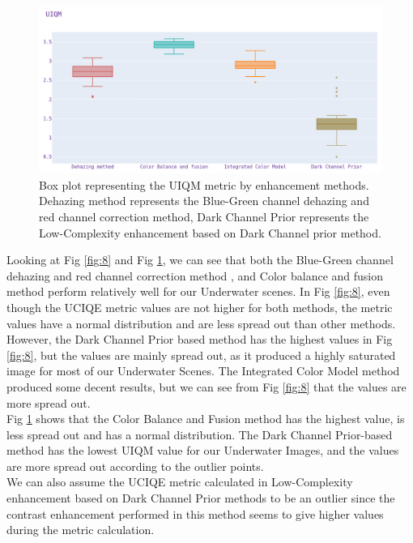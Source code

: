 \documentclass[a4paper,11pt,oneside]{article}
\begin{document}
  \begin{figure}[H]
  \begin{center}
  \includegraphics[width=\linewidth]{box1.png}
  \end{center}
  \caption{Box plot representing the UIQM metric by enhancement methods. Dehazing method represents the Blue-Green channel dehazing and red channel correction method, Dark Channel Prior represents the Low-Complexity enhancement based on Dark Channel prior method.}
  \label{fig:9}
  \end{figure}
  Looking at Fig \ref{fig:8} and Fig \ref{fig:9}, we can see that both the Blue-Green channel dehazing and red channel correction method \cite{26}, and Color balance and fusion method \cite{16} perform relatively well for our Underwater scenes. In Fig \ref{fig:8}, even though the UCIQE metric values are not higher for both methods, the metric values have a normal distribution and are less spread out than other methods. However, the Dark Channel Prior based method has the highest values in Fig \ref{fig:8}, but the values are mainly spread out, as it produced a highly saturated image for most of our Underwater Scenes. The Integrated Color Model method \cite{4} produced some decent results, but we can see from Fig \ref{fig:8} that the values are more spread out.\\
   Fig \ref{fig:9} shows that the Color Balance and Fusion method \cite{16} has the highest value, is less spread out and has a normal distribution. The Dark Channel Prior-based method has the lowest UIQM value for our Underwater Images, and the values are more spread out according to the outlier points.\\
  We can also assume the UCIQE metric calculated in Low-Complexity enhancement based on Dark Channel Prior methods to be an outlier since the contrast enhancement performed in this method seems to give higher values during the metric calculation.\\
\end{document}
